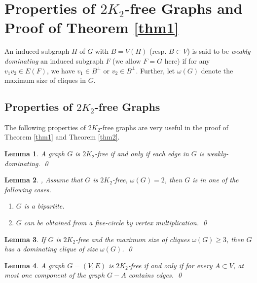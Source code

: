 \documentclass{amsart}
\newtheorem{lemma}{Lemma}
\begin{document}
\section{Properties of $2K_2$-free Graphs and Proof of Theorem \ref{thm1}}
An induced subgraph $H$ of $G$ with $B=V(H)$ (resp. $B\subset V$) is said to be {\em weakly-dominating}
an induced subgraph $F$ (we allow $F=G$ here) 
if for any $v_1v_2\in E(F)$, we have $v_1\in B^\perp$ or $v_2\in B^\perp$.
Further, let $\omega(G)$ denote the maximum size of cliques in $G$. 

\subsection{Properties of $2K_2$-free Graphs}
The following properties of $2K_2$-free graphs are very useful in the proof of Theorem \ref{thm1} and Theorem \ref{thm2}.

\begin{lemma}\label{trivial}
A graph $G$ is $2K_2$-free if and only if each edge in $G$ is weakly-dominating. \qed
\end{lemma}

\begin{lemma}\label{lm1}{\cite[Theorem 2]{chung1990maximum}, \cite[Lemma 2]{broersma2014toughness}}
Assume that $G$ is $2K_2$-free, $\omega(G)=2$, then $G$ is in one of the following cases.
\begin{enumerate}
\item $G$ is a bipartite.
\item $G$ can be obtained from a five-circle by vertex multiplication. \qed
\end{enumerate}
\end{lemma}

\begin{lemma}\label{lm2}{\cite[Theorem 3]{chung1990maximum}}
If $G$ is $2K_2$-free and the maximum size of cliques $\omega(G)\ge3$, then $G$ has a dominating clique of size $\omega(G)$. \qed
\end{lemma}

\begin{lemma}\label{lm3}{\cite[Observation 1]{broersma2014toughness}}
A graph $G=(V,E)$ is $2K_2$-free if and only if for every $A\subset V$, at most one component of the graph $G-A$ contains edges. \qed
\end{lemma}
\end{document}
